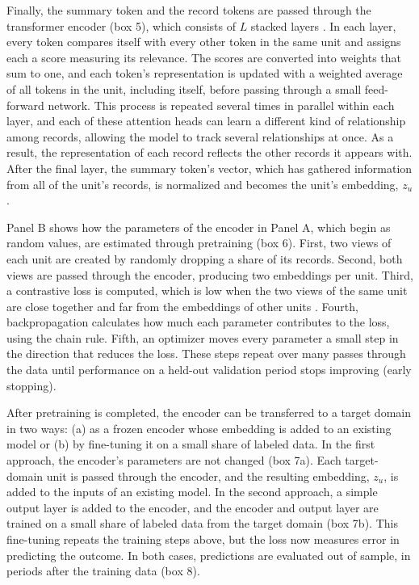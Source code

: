 \documentclass[11pt, letterpaper]{article}
\begin{document}
Finally, the summary token and the record tokens are passed through the transformer encoder (box 5), which consists of $L$ stacked layers \citep{vaswani2017attention}. In each layer, every token compares itself with every other token in the same unit and assigns each a score measuring its relevance. The scores are converted into weights that sum to one, and each token's representation is updated with a weighted average of all tokens in the unit, including itself, before passing through a small feed-forward network. %
This process is repeated several times in parallel within each layer, and each of these attention heads can learn a different kind of relationship among records, allowing the model to track several relationships at once. As a result, the representation of each record reflects the other records it appears with. After the final layer, the summary token's vector, which has gathered information from all of the unit's records, is normalized and becomes the unit's embedding, $z_u$.

Panel B shows how the parameters of the encoder in Panel A, which begin as random values, are estimated through pretraining (box 6). First, two views of each unit are created by randomly dropping a share of its records. Second, both views are passed through the encoder, producing two embeddings per unit. Third, a contrastive loss is computed, which is low when the two views of the same unit are close together and far from the embeddings of other units \citep{chen2020simclr}. Fourth, backpropagation calculates how much each parameter contributes to the loss, using the chain rule. Fifth, an optimizer moves every parameter a small step in the direction that reduces the loss. These steps repeat over many passes through the data until performance on a held-out validation period stops improving (early stopping).

After pretraining is completed, the encoder can be transferred to a target domain in two ways: (a) as a frozen encoder whose embedding is added to an existing model or (b) by fine-tuning it on a small share of labeled data. In the first approach, the encoder's parameters are not changed (box 7a). Each target-domain unit is passed through the encoder, and the resulting embedding, $z_u$, is added to the inputs of an existing model. %
In the second approach, a simple output layer is added to the encoder, and the encoder and output layer are trained on a small share of labeled data from the target domain (box 7b). This fine-tuning repeats the training steps above, but the loss now measures error in predicting the outcome. %
In both cases, predictions are evaluated out of sample, in periods after the training data (box 8).
\end{document}
